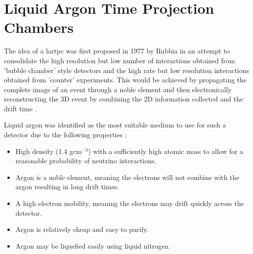 \section{Liquid Argon Time Projection Chambers}

The idea of a \gls{lartpc} was first proposed in 1977 by Rubbia in an attempt to consolidate the high resolution but low number of interactions obtained from 'bubble chamber' style detectors and the high rate but low resolution interactions obtained from 'counter' experiments. This would be achieved by propagating the complete image of an event through a noble element and then electronically reconstructing the 3D event by combining the 2D information collected and the drift time \cite{LArTPC_proposal}.

Liquid argon was identified as the most suitable medium to use for such a detector due to the following properties \cite{LArTPC_proposal}; 
\begin{itemize}
    \item High density (1.4 gcm$^{-3}$) with a sufficiently high atomic mass to allow for a reasonable probability of neutrino interactions.
    \item Argon is a noble element, meaning the electrons will not combine with the argon resulting in long drift times.
    \item A high electron mobility, meaning the electrons may drift quickly across the detector.
    \item Argon is relatively cheap and easy to purify.
    \item Argon may be liquefied easily using liquid nitrogen. 
\end{itemize}

